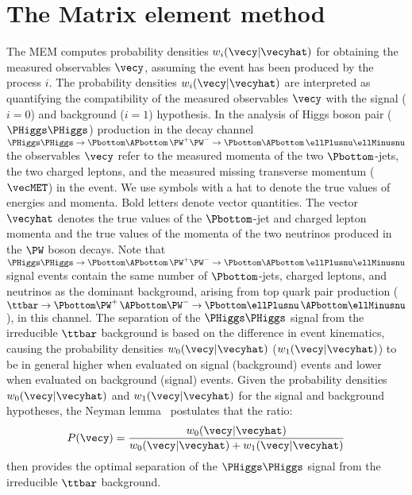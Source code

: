\section{The Matrix element method}
\label{sec:mem}

The MEM computes probability densities $w_{i}(\vecy|\vecyhat)$
for obtaining the measured observables $\vecy$, assuming the event has been produced by the process $i$.
The probability densities $w_{i}(\vecy|\vecyhat)$ are interpreted as quantifying the compatibility of the measured observables $\vecy$
with the signal ($i=0$) and background ($i=1$) hypothesis.
In the analysis of Higgs boson pair ($\PHiggs\PHiggs$) production in the decay channel 
$\PHiggs\PHiggs \to \Pbottom\APbottom \, \PW^{+}\PW^{-} \to \Pbottom\APbottom \, \ellPlusnu\ellMinusnu$
the observables $\vecy$ refer to 
the measured momenta of the two $\Pbottom$-jets, the two charged leptons, and the measured missing transverse momentum ($\vecMET$) in the event.
We use symbols with a hat to denote the true values of energies and momenta.
Bold letters denote vector quantities.
The vector $\vecyhat$ denotes the true values of the $\Pbottom$-jet and charged lepton momenta and the true values of the momenta of the two neutrinos produced in the $\PW$ boson decays.
Note that $\PHiggs\PHiggs \to \Pbottom\APbottom \, \PW^{+}\PW^{-} \to \Pbottom\APbottom \, \ellPlusnu\ellMinusnu$ signal events
contain the same number of $\Pbottom$-jets, charged leptons, and neutrinos as the dominant background,
arising from top quark pair production ($\ttbar \to \Pbottom\PW^{+} \, \APbottom\PW^{-} \to \Pbottom\ellPlusnu \, \APbottom\ellMinusnu$),
in this channel.
The separation of the $\PHiggs\PHiggs$ signal from the irreducible $\ttbar$ background is based on the difference in event kinematics,
causing the probability densities $w_{0}(\vecy|\vecyhat)$ ($w_{1}(\vecy|\vecyhat)$) to be in general higher when evaluated on signal (background) events
and lower when evaluated on background (signal) events.
Given the probability densities $w_{0}(\vecy|\vecyhat)$ and $w_{1}(\vecy|\vecyhat)$ for the signal and background hypotheses,
the Neyman lemma~\cite{Neyman:1937uhy} postulates that the ratio:
\begin{equation*}
P(\vecy) = \frac{w_{0}(\vecy|\vecyhat)}{w_{0}(\vecy|\vecyhat) + w_{1}(\vecy|\vecyhat)}
\end{equation*}
then provides the optimal separation of the $\PHiggs\PHiggs$ signal from the irreducible $\ttbar$ background.

